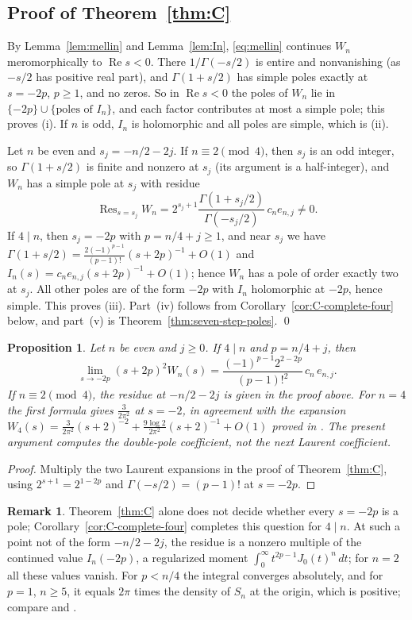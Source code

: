 \documentclass[11pt]{amsart}
\newtheorem{proposition}[thm]{Proposition}
\theoremstyle{definition}
\newtheorem{remark}[thm]{Remark}
\newcommand{\Res}{\operatorname{Res}}
\begin{document}
\subsection{Proof of \texorpdfstring{Theorem~\ref{thm:C}}{Theorem C}}
By Lemma~\ref{lem:mellin} and Lemma~\ref{lem:In}, \eqref{eq:mellin} continues $W_n$ meromorphically to $\operatorname{Re}s<0$. There $1/\Gamma(-s/2)$ is entire and nonvanishing (as $-s/2$ has positive real part), and $\Gamma(1+s/2)$ has simple poles exactly at $s=-2p$, $p\ge1$, and no zeros. So in $\operatorname{Re}s<0$ the poles of $W_n$ lie in $\{-2p\}\cup\{\text{poles of }I_n\}$, and each factor contributes at most a simple pole; this proves (i). If $n$ is odd, $I_n$ is holomorphic and all poles are simple, which is (ii).

Let $n$ be even and $s_j=-n/2-2j$. If $n\equiv2\pmod4$, then $s_j$ is an odd integer, so $\Gamma(1+s/2)$ is finite and nonzero at $s_j$ (its argument is a half-integer), and $W_n$ has a simple pole at $s_j$ with residue
\[
\Res_{s=s_j}W_n=2^{s_j+1}\frac{\Gamma(1+s_j/2)}{\Gamma(-s_j/2)}\,c_ne_{n,j}\ne0.
\]
If $4\mid n$, then $s_j=-2p$ with $p=n/4+j\ge1$, and near $s_j$ we have $\Gamma(1+s/2)=\frac{2(-1)^{p-1}}{(p-1)!}(s+2p)^{-1}+O(1)$ and $I_n(s)=c_ne_{n,j}(s+2p)^{-1}+O(1)$; hence $W_n$ has a pole of order exactly two at $s_j$. All other poles are of the form $-2p$ with $I_n$ holomorphic at $-2p$, hence simple. This proves (iii). Part~(iv) follows from Corollary~\ref{cor:C-complete-four} below, and part~(v) is Theorem~\ref{thm:seven-step-poles}. \qed

\begin{proposition}\label{prop:Wcoef}
Let $n$ be even and $j\ge0$. If $4\mid n$ and $p=n/4+j$, then
\[
\lim_{s\to-2p}(s+2p)^2W_n(s)=\frac{(-1)^{p-1}2^{2-2p}}{(p-1)!^2}\,c_n\,e_{n,j}.
\]
If $n\equiv2\pmod4$, the residue at $-n/2-2j$ is given in the proof above. For $n=4$ the first formula gives $\frac{3}{2\pi^2}$ at $s=-2$, in agreement with the expansion $W_4(s)=\frac3{2\pi^2}(s+2)^{-2}+\frac{9\log2}{2\pi^2}(s+2)^{-1}+O(1)$ proved in \cite[Example~4]{BSWZ12}. The present argument computes the double-pole coefficient, not the next Laurent coefficient.
\end{proposition}

\begin{proof}
Multiply the two Laurent expansions in the proof of Theorem~\ref{thm:C}, using $2^{s+1}=2^{1-2p}$ and $\Gamma(-s/2)=(p-1)!$ at $s=-2p$.
\end{proof}

\begin{remark}
Theorem~\ref{thm:C} alone does not decide whether every $s=-2p$ is a pole; Corollary~\ref{cor:C-complete-four} completes this question for $4\mid n$. At such a point not of the form $-n/2-2j$, the residue is a nonzero multiple of the continued value $I_n(-2p)$, a regularized moment $\int_0^\infty t^{2p-1}J_0(t)^n\,dt$; for $n=2$ all these values vanish. For $p<n/4$ the integral converges absolutely, and for $p=1$, $n\ge5$, it equals $2\pi$ times the density of $S_n$ at the origin, which is positive; compare \cite[Prop.~1]{BSW13} and \cite[\S5]{BSWZ12}.
\end{remark}
\end{document}
